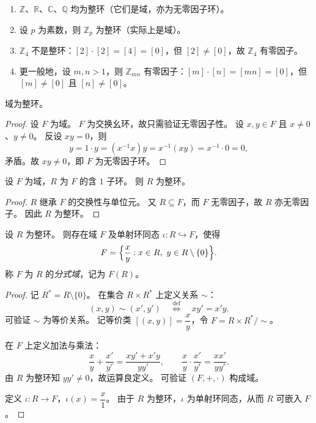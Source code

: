 \documentclass[lang=cn,a4paper,newtx]{elegantbook}
\begin{document}
\begin{example}
  \begin{enumerate}
    \item $\mathbb{Z}$、$\mathbb{R}$、$\mathbb{C}$、$\mathbb{Q}$ 均为整环（它们是域，亦为无零因子环）。
    \item 设 $p$ 为素数，则 $\mathbb{Z}_p$ 为整环（实际上是域）。
    \item $\mathbb{Z}_4$ 不是整环：$[2]\cdot[2]=[4]=[0]$，但 $[2]\ne[0]$，故 $\mathbb{Z}_4$ 有零因子。
    \item 更一般地，设 $m,n>1$，则 $\mathbb{Z}_{mn}$ 有零因子：$[m]\cdot[n]=[mn]=[0]$，但 $[m]\ne[0]$ 且 $[n]\ne[0]$。
  \end{enumerate}
\end{example}

\begin{proposition}\label{field-is-domain}
  域为整环。
\end{proposition}

\begin{proof}
  设 $F$ 为域。
  $F$ 为交换幺环，故只需验证无零因子性。
  设 $x,y\in F$ 且 $x\ne 0$、$y\ne 0$。
  反设 $xy=0$，则
  \[
    y = 1\cdot y = (x^{-1}x)y = x^{-1}(xy) = x^{-1}\cdot 0 = 0,
  \]
  矛盾。故 $xy\ne 0$，即 $F$ 为无零因子环。
\end{proof}

\begin{proposition}
  设 $F$ 为域，$R$ 为 $F$ 的含 $1$ 子环。
  则 $R$ 为整环。
\end{proposition}

\begin{proof}
  $R$ 继承 $F$ 的交换性与单位元。
  又 $R\subseteq F$，而 $F$ 无零因子，故 $R$ 亦无零因子。
  因此 $R$ 为整环。
\end{proof}

\begin{theorem}[分式域的存在性]
  设 $R$ 为整环。
  则存在域 $F$ 及单射环同态 $\iota\colon R\hookrightarrow F$，使得
  \[
    F=\Bigl\{\frac{x}{y}: x\in R,\ y\in R\setminus\{0\}\Bigr\}.
  \]
  称 $F$ 为 $R$ 的\emph{分式域}，记为 $F(R)$。
\end{theorem}

\begin{proof}
  记 $R^{*}=R\setminus\{0\}$。
  在集合 $R\times R^{*}$ 上定义关系 $\sim$：
  \[
    (x,y)\sim(x',y') \quad\stackrel{\mathrm{def}}{\iff}\quad xy'=x'y.
  \]
  可验证 $\sim$ 为等价关系。
  记等价类 $[(x,y)]=\dfrac{x}{y}$，令 $F=R\times R^{*}/{\sim}$。

  在 $F$ 上定义加法与乘法：
  \[
    \frac{x}{y}+\frac{x'}{y'}=\frac{xy'+x'y}{yy'},\qquad
    \frac{x}{y}\cdot\frac{x'}{y'}=\frac{xx'}{yy'}.
  \]
  由 $R$ 为整环知 $yy'\ne 0$，故运算良定义。
  可验证 $(F,+,\cdot)$ 构成域。

  定义 $\iota\colon R\to F$，$\iota(x)=\dfrac{x}{1}$。
  由于 $R$ 为整环，$\iota$ 为单射环同态，从而 $R$ 可嵌入 $F$。
\end{proof}
\end{document}
